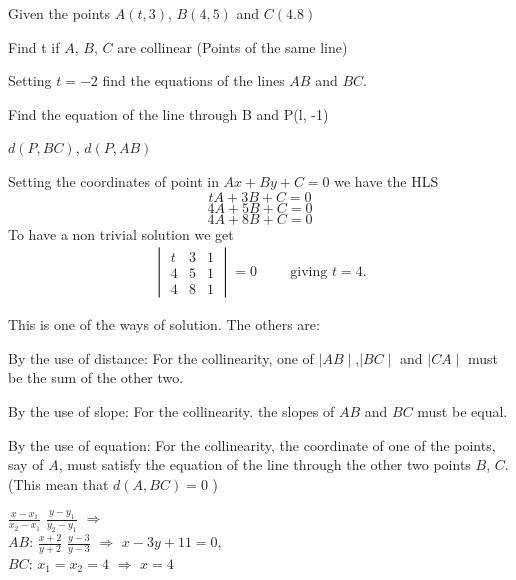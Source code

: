 \documentclass[11pt]{amsbook}
\begin{document}
\begin{exmp}
	 Given the points $A(t, 3)$, $B(4, 5)$ and $C(4.8)$ 
	\begin{hEnumerateAlpha}
		\item Find t if $A$, $B$, $C$ are collinear (Points of the same line) 

		\item Setting $t=-2$ find the equations of the lines $AB$ and $BC$. 

		\item Find the equation of the line through B and P(l, -1) 

		\item $d(P, BC)$, $d(P, AB)$ 
	\end{hEnumerateAlpha}

	\begin{hSolution}
		\begin{hEnumerateAlpha}
			\item Setting the coordinates of point in $Ax + By + C = 0$  we have the HLS 
			$$tA + 3B + C = 0$$ $$4A + 5B + C = 0$$ $$4A + 8B + C = 0$$ 
			To have a non trivial solution we get
		 \begin{align*}
			\begin{vmatrix}
			t & 3 & 1 \\ 
			4 & 5 & 1 \\
			4 & 8 & 1 
			\end{vmatrix}
			=0   
			\hspace{1cm}  \text{giving  $t = 4$.} 
		\end{align*}
	
   
   	       This is one of the ways of solution. The others are:
	       \begin{hEnumerateArabic}
			\item  By the use of distance: For the collinearity, one of $\mid AB \mid$,$\mid BC \mid$ and $\mid CA \mid$ must be the sum of the 				other two.
			\item By the use of slope: For the collinearity. the slopes of $AB$ and $BC$ must be equal. 
			\item By the use of equation: For the collinearity, the coordinate of one of the points, say of $A$, must satisfy the equation of the line 					through the other two points $B$, $C$. (This mean that $d(A, BC) = 0$ )
		\end{hEnumerateArabic}
	
		 \item \( \frac{x - x_1}{x_2 - x_1} \) \( \frac{y - y_1}{y_2 - y_1} \) $\Rightarrow$ \\
   		  
		  $AB$: \( \frac{x + 2}{y + 2} \) \( \frac{y - 3}{y - 3} \) $\Rightarrow$ $x - 3y + 11 = 0$, \\	
   
       		  $BC$: $x_1 = x_2 = 4$ $\Rightarrow$ $x = 4$
		
		\end{hEnumerateAlpha}
	\end{hSolution}
\end{exmp}
\end{document}
